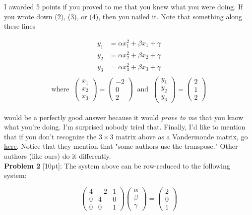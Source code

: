 \documentclass{article}
\def\a{\alpha}
\def\b{\beta}
\def\c{\gamma}
\begin{document}
I awarded 5 points if you proved to me that you knew what you were doing. If you wrote down (2), (3), or (4), then you nailed it. Note that something along these lines 

\begin{align*}
y_1 &=  \a x_1^2 + \b x_1 + \c \\
y_2 &=  \a x_2^2 + \b x_2 + \c \\
y_3 &=  \a x_3^2 + \b x_3 + \c  \\
\end{align*}
\[
\text{where} \;\; \begin{pmatrix} x_1 \\ x_2 \\ x_3 \end{pmatrix} = \begin{pmatrix} -2 \\ 0 \\ 2 \end{pmatrix} \;\; \text{and} \;\; \begin{pmatrix} y_1 \\ y_2 \\ y_3 \end{pmatrix} = \begin{pmatrix} 2 \\ 1 \\ 2 \end{pmatrix}
\] \\

{\setlength{\parindent}{0cm}
would be a perfectly good answer because it would \textit{prove to me} that you know what you're doing. I'm surprised nobody tried that. Finally, I'd like to mention that if you don't  recognize the $3 \times 3$ matrix above as a Vandermonde matrix, go {\color{cyan} \underline{\href{http://en.wikipedia.org/wiki/Vandermonde_matrix}{here}}}. Notice that they mention that "some authors use the transpose." Other authors (like ours) do it differently.}\\

\textbf{Problem 2} [10pt]: The system above can be row-reduced to the following system:

\[
\begin{pmatrix} 4 & -2 & 1 \\ 0 & 4 & 0 \\ 0 & 0 & 1 \end{pmatrix} \begin{pmatrix} \a \\ \b \\ \c \end{pmatrix} = \begin{pmatrix} 2 \\ 0 \\ 1 \end{pmatrix}
\]
\end{document}
